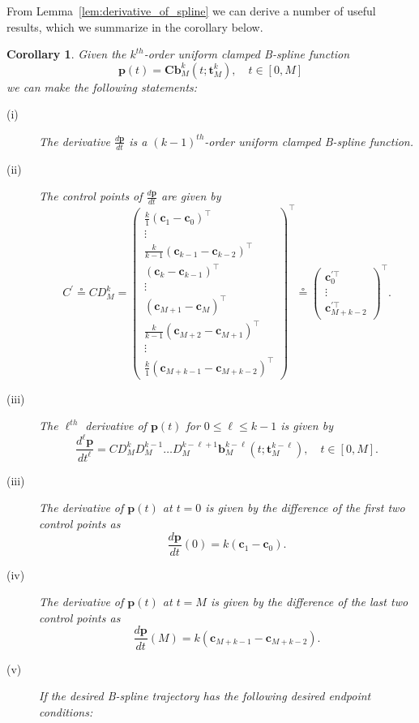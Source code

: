 \documentclass{article}
\newtheorem{corollary}[theorem]{Corollary}
\newcommand{\defeq}{\circeq}
\newcommand{\bbf}{\mathbf{b}}
\newcommand{\cbf}{\mathbf{c}}
\newcommand{\Cbf}{\mathbf{C}}
\begin{document}
From Lemma~\ref{lem:derivative_of_spline} we can derive a number of useful results, which we summarize in the corollary below.
\begin{corollary}
	Given the $k^{th}$-order uniform clamped B-spline function
	\[
	\mathbf{p}(t) = \Cbf \bbf_M^k(t; \mathbf{t}_M^k), \quad t\in[0, M]
	\]
	we can make the following statements:
	\begin{description}
	\item[(i)] The derivative  $\frac{d\mathbf{p}}{dt}$ is a $(k-1)^{th}$-order uniform clamped B-spline function.
	\item[(ii)] The control points of $\frac{d\mathbf{p}}{dt}$ are given by
		\[
		C^{'} \defeq C D_M^k = \begin{pmatrix}
				\frac{k}{1} (\cbf_1 - \cbf_0)^\top \\
				\vdots \\
				\frac{k}{k-1} (\cbf_{k-1} - \cbf_{k-2})^\top \\
				(\cbf_k - \cbf_{k-1})^\top \\
				\vdots \\
				(\cbf_{M+1} - \cbf_{M})^\top \\
				\frac{k}{k-1} (\cbf_{M+2}-\cbf_{M+1})^\top \\
				\vdots \\
				\frac{k}{1} (\cbf_{M+k-1} - \cbf_{M+k-2})^\top
 				\end{pmatrix}^\top
 			\defeq \begin{pmatrix}
 			        \cbf_0^{'\top} \\
 			        \vdots \\
 			        \cbf_{M+k-2}^{'\top}
 				   \end{pmatrix}^\top.
		\]
	\item[(iii)] The $\ell^{th}$ derivative of $\mathbf{p}(t)$ for $0\leq\ell\leq k-1$ is given by
		\[
			\frac{d^{\ell}\mathbf{p}}{dt^{\ell}} = C D_M^k D_M^{k-1} \dots D_M^{k-\ell+1} \bbf_M^{k-\ell}(t; \mathbf{t}_M^{k-\ell}), \quad t\in [0, M].
		\]
	\item[(iii)] The derivative of $\mathbf{p}(t)$ at $t=0$ is given by the difference of the first two control points as
		\[
			\frac{d\mathbf{p}}{dt}(0) = k(\cbf_1 - \cbf_0).
		\]
	\item[(iv)] The derivative of $\mathbf{p}(t)$ at $t=M$ is given by the difference of the last two control points as
		\[
			\frac{d\mathbf{p}}{dt}(M) = k(\cbf_{M+k-1} - \cbf_{M+k-2}).
		\]
	\item[(v)] If the desired B-spline trajectory has the following desired endpoint conditions:

\end{description}
\end{corollary}
\end{document}
